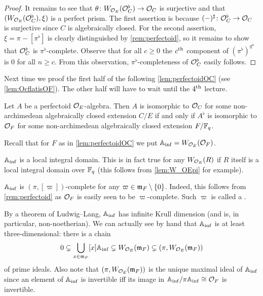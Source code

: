 \documentclass[a4paper, 10pt, oneside, DIV=9, chapterprefix=true, numbers=enddot,bibliography=totoc]{scrbook}
\begin{document}
\begin{proof}
	It remains to see that $\theta\colon W_{\Oo_E}(\Oo_C^\flat)\morphism\Oo_C$ is surjective and that $(W_{\mathcal{O}_E}(\mathcal{O}_C^\flat),\xi)$ is a perfect prism. The first assertion is because $(-)^\sharp\colon \Oo_C^\flat\morphism\Oo_C$ is surjective since $C$ is algebraically closed. For the second assertion, $\xi=\pi-[\pi^\flat]$ is clearly distinguished by \cref{rem:perfectoid}, so it remains to show that $\mathcal{O}_C^\flat$ is $\pi^\flat$-complete. Observe that for all $c\geq 0$ the $c^{\text{th}}$ component of $(\pi^\flat)^{q^n}$ is $0$ for all $n\geq c$. From this observation, $\pi^\flat$-completeness of $\mathcal{O}_C^\flat$ easily follows.
\end{proof}
Next time we proof the first half of the following \cref{lem:perfectoidOC} (see \cref{lem:OcflatisOF}). The other half will have to wait until the $4^{\text{th}}$ lecture.
\begin{lem}\label{lem:perfectoidOC}
	Let $A$ be a perfectoid $\mathcal{O}_E$-algebra. Then $A$ is isomorphic to $\mathcal{O}_C$ for some non-archimedean algebraically closed extension $C/E$ if and only if $A^\flat$ is isomorphic to $\mathcal{O}_F$ for some non-archimedean algebraically closed extension $F/\mathbb{F}_q$.
\end{lem}
\begin{rem}\label{rem:AinfProperties}
	Recall that for $F$ as in \cref{lem:perfectoidOC} we put $\mathbb{A}_{\mathrm{inf}}=W_{\mathcal{O}_E}(\mathcal{O}_F)$.
	\begin{numerate}
		\item $\mathbb{A}_{\mathrm{inf}}$ is a local integral domain. This is in fact true for any $W_{\mathcal{O}_E}(R)$ if $R$ itself is a local integral domain over $\mathbb{F}_q$ (this follows from \cref{lem:W_OEpi} for example).
		\item $\mathbb{A}_{\mathrm{inf}}$ is $(\pi,[\varpi])$-complete for any $\varpi\in\mathfrak{m}_F\setminus \{0\}$. Indeed, this follows from \cref{rem:perfectoid} as $\mathcal{O}_F$ is easily seen to be $\varpi$-complete. Such $\varpi$ is called a .
		\item By a theorem of Ludwig--Lang, $\mathbb{A}_{\mathrm{inf}}$ has infinite Krull dimension (and is, in particular, non-noetherian). We can actually see by hand that $\mathbb{A}_{\mathrm{inf}}$ is at least three-dimensional: there is a chain
		\begin{equation*}
			0\subsetneq\bigcup_{x\in\mathfrak{m}_F}[x]\mathbb{A}_{\mathrm{inf}}\subsetneq W_{\mathcal{O}_E}(\mathfrak{m}_F)\subsetneq (\pi,W_{\mathcal{O}_E}(\mathfrak{m}_F))
		\end{equation*}
		of prime ideals. Also note that $(\pi,W_{\mathcal{O}_E}(\mathfrak{m}_F))$ is the unique maximal ideal of $\mathbb{A}_{\mathrm{inf}}$ since an element of $\mathbb{A}_{\mathrm{inf}}$ is invertible iff its image in $\mathbb{A}_{\mathrm{inf}}/\pi\mathbb{A}_{\mathrm{inf}}\cong \mathcal{O}_F$ is invertible.
	\end{numerate}
\end{rem}
\end{document}

